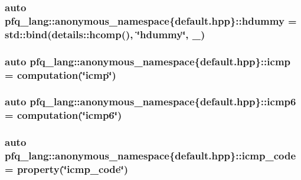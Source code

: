 \hypertarget{namespacepfq__lang_1_1anonymous__namespace_02default_8hpp_03_a4e7cf4874b42c5722f420fc54f360242}{
\subsubsection[{hdummy}]{\setlength{\rightskip}{0pt plus 5cm}auto pfq\-\_\-lang\-::anonymous\-\_\-namespace\{default.\-hpp\}\-::hdummy = std\-::bind(details\-::hcomp(), \char`\"{}hdummy\char`\"{}, \-\_)}}\label{namespacepfq__lang_1_1anonymous__namespace_02default_8hpp_03_a4e7cf4874b42c5722f420fc54f360242}
\hypertarget{namespacepfq__lang_1_1anonymous__namespace_02default_8hpp_03_a180c8185595965a528fd2590da7dbeb9}{
\subsubsection[{icmp}]{\setlength{\rightskip}{0pt plus 5cm}auto pfq\-\_\-lang\-::anonymous\-\_\-namespace\{default.\-hpp\}\-::icmp = {\bf computation}(\char`\"{}icmp\char`\"{})}}\label{namespacepfq__lang_1_1anonymous__namespace_02default_8hpp_03_a180c8185595965a528fd2590da7dbeb9}
\hypertarget{namespacepfq__lang_1_1anonymous__namespace_02default_8hpp_03_ab1e01b177ae34e48f61eed78580aeac0}{
\subsubsection[{icmp6}]{\setlength{\rightskip}{0pt plus 5cm}auto pfq\-\_\-lang\-::anonymous\-\_\-namespace\{default.\-hpp\}\-::icmp6 = {\bf computation}(\char`\"{}icmp6\char`\"{})}}\label{namespacepfq__lang_1_1anonymous__namespace_02default_8hpp_03_ab1e01b177ae34e48f61eed78580aeac0}
\hypertarget{namespacepfq__lang_1_1anonymous__namespace_02default_8hpp_03_aad0f666aca065f5aaf283857e5c933ce}{
\subsubsection[{icmp\-\_\-code}]{\setlength{\rightskip}{0pt plus 5cm}auto pfq\-\_\-lang\-::anonymous\-\_\-namespace\{default.\-hpp\}\-::icmp\-\_\-code = {\bf property}(\char`\"{}icmp\-\_\-code\char`\"{})}}\label{namespacepfq__lang_1_1anonymous__namespace_02default_8hpp_03_aad0f666aca065f5aaf283857e5c933ce}

